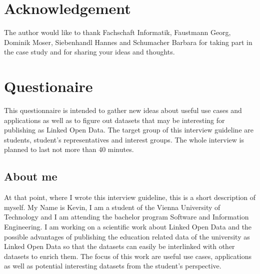 \documentclass{article}
\begin{document}
\section{Acknowledgement}
\label{acknowledgement}
The author would like to thank Fachschaft Informatik, Faustmann Georg, Dominik Moser, Siebenhandl Hannes and Schumacher Barbara for taking part in the case study and for sharing your ideas and thoughts.

\newpage

\printbibliography[title={References to refereed scientific work}, keyword=refsw]

\printbibliography[title={References to non-refereed work}, keyword=nonrefw]

\printbibliography[title={References to websites}, type=misc]

\newpage
\appendix


\section{Questionaire}
\label{questionaire}
This questionnaire is intended to gather new ideas about useful use cases and applications as well as to figure out datasets that may be interesting for publishing as Linked Open Data. The target group of this interview guideline are students, student’s representatives and interest groups. The whole interview is planned to last not more than 40 minutes.

\subsection{About me}
\label{questionaire:about-me}
At that point, where I wrote this interview guideline, this is a short description of myself. My Name is Kevin, I am a student of the Vienna University of Technology and I am attending the bachelor program Software and Information Engineering. I am working on a scientific work about Linked Open Data and the possible advantages of publishing the education related data of the university as Linked Open Data so that the datasets can easily be interlinked with other datasets to enrich them. The focus of this work are useful use cases, applications as well as potential interesting datasets from the student’s perspective.
\end{document}
